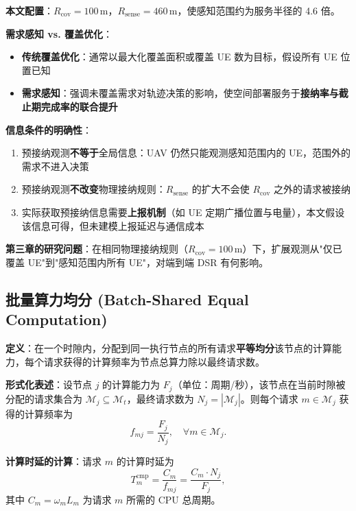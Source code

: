 \textbf{本文配置}：$R_{\mathrm{cov}} = 100\,\mathrm{m}$，$R_{\mathrm{sense}} = 460\,\mathrm{m}$，使感知范围约为服务半径的 4.6 倍。

\textbf{需求感知 vs. 覆盖优化}：
\begin{itemize}
    \item \textbf{传统覆盖优化}：通常以最大化覆盖面积或覆盖 UE 数为目标，假设所有 UE 位置已知
    \item \textbf{需求感知}：强调未覆盖需求对轨迹决策的影响，使空间部署服务于\textbf{接纳率与截止期完成率的联合提升}
\end{itemize}

\textbf{信息条件的明确性}：
\begin{enumerate}
    \item 预接纳观测\textbf{不等于}全局信息：UAV 仍然只能观测感知范围内的 UE，范围外的需求不进入决策
    \item 预接纳观测\textbf{不改变}物理接纳规则：$R_{\mathrm{sense}}$ 的扩大不会使 $R_{\mathrm{cov}}$ 之外的请求被接纳
    \item 实际获取预接纳信息需要\textbf{上报机制}（如 UE 定期广播位置与电量），本文假设该信息可得，但未建模上报延迟与通信成本
\end{enumerate}

\textbf{第三章的研究问题}：在相同物理接纳规则（$R_{\mathrm{cov}} = 100\,\mathrm{m}$）下，扩展观测从"仅已覆盖 UE"到"感知范围内所有 UE"，对端到端 DSR 有何影响。

\subsection{批量算力均分 (Batch-Shared Equal Computation)}
\label{sec:ch2-term-batch-shared}

\textbf{定义}：在一个时隙内，分配到同一执行节点的所有请求\textbf{平等均分}该节点的计算能力，每个请求获得的计算频率为节点总算力除以最终请求数。

\textbf{形式化表述}：设节点 $j$ 的计算能力为 $F_j$（单位：周期/秒），该节点在当前时隙被分配的请求集合为 $\mathcal{M}_j \subseteq \mathcal{M}_t$，最终请求数为 $N_j = |\mathcal{M}_j|$。则每个请求 $m \in \mathcal{M}_j$ 获得的计算频率为
\begin{equation}
    f_{mj} = \frac{F_j}{N_j}, \quad \forall m \in \mathcal{M}_j.
    \label{eq:ch2-term-batch-shared}
\end{equation}

\textbf{计算时延的计算}：请求 $m$ 的计算时延为
\begin{equation}
    T_m^{\mathrm{cmp}} = \frac{C_m}{f_{mj}} = \frac{C_m \cdot N_j}{F_j},
    \label{eq:ch2-term-comp-delay}
\end{equation}
其中 $C_m = \omega_m L_m$ 为请求 $m$ 所需的 CPU 总周期。

